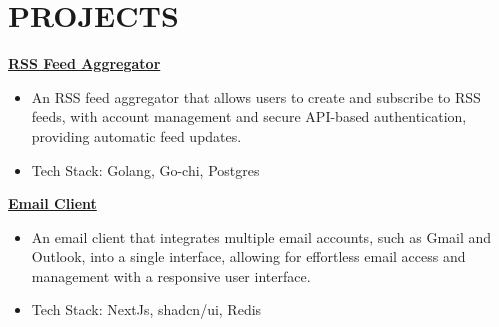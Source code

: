 \documentclass[]{resume}
\begin{document}
\section{PROJECTS}
\href{https://github.com/saswatax/rss-aggregator}{\textbf{RSS Feed Aggregator} \space\faExternalLink*}
\begin{itemize}
  \item An RSS feed aggregator that allows users to create and subscribe to RSS feeds, with account management and secure API-based authentication, providing automatic feed updates.
  \item Tech Stack: Golang, Go-chi, Postgres
\end{itemize}
\vspace{.2em}
\href{https://github.com/saswatax/email-client}{\textbf{Email Client} \space\faExternalLink*}
\begin{itemize}
  \item An email client that integrates multiple email accounts, such as Gmail and Outlook, into a single interface, allowing for effortless email access and management with a responsive user interface.
  \item Tech Stack: NextJs, shadcn/ui, Redis
\end{itemize}
\end{document}
